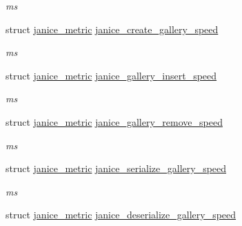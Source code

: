 \begin{DoxyCompactItemize}
\begin{DoxyCompactList}\small\item\em ms \end{DoxyCompactList}\item 
\hypertarget{structjanice__metrics_a156ed6a7e2ace1daef014af5202eda8f}{}struct \hyperlink{structjanice__metric}{janice\+\_\+metric} \hyperlink{structjanice__metrics_a156ed6a7e2ace1daef014af5202eda8f}{janice\+\_\+create\+\_\+gallery\+\_\+speed}\label{structjanice__metrics_a156ed6a7e2ace1daef014af5202eda8f}

\begin{DoxyCompactList}\small\item\em ms \end{DoxyCompactList}\item 
\hypertarget{structjanice__metrics_adde99d91b8bc0626e9f4ed24f3542e3f}{}struct \hyperlink{structjanice__metric}{janice\+\_\+metric} \hyperlink{structjanice__metrics_adde99d91b8bc0626e9f4ed24f3542e3f}{janice\+\_\+gallery\+\_\+insert\+\_\+speed}\label{structjanice__metrics_adde99d91b8bc0626e9f4ed24f3542e3f}

\begin{DoxyCompactList}\small\item\em ms \end{DoxyCompactList}\item 
\hypertarget{structjanice__metrics_a2a69b582c1729b2992cfe65bce6fa790}{}struct \hyperlink{structjanice__metric}{janice\+\_\+metric} \hyperlink{structjanice__metrics_a2a69b582c1729b2992cfe65bce6fa790}{janice\+\_\+gallery\+\_\+remove\+\_\+speed}\label{structjanice__metrics_a2a69b582c1729b2992cfe65bce6fa790}

\begin{DoxyCompactList}\small\item\em ms \end{DoxyCompactList}\item 
\hypertarget{structjanice__metrics_aa23bb604381d13d8c673290a5064fed1}{}struct \hyperlink{structjanice__metric}{janice\+\_\+metric} \hyperlink{structjanice__metrics_aa23bb604381d13d8c673290a5064fed1}{janice\+\_\+serialize\+\_\+gallery\+\_\+speed}\label{structjanice__metrics_aa23bb604381d13d8c673290a5064fed1}

\begin{DoxyCompactList}\small\item\em ms \end{DoxyCompactList}\item 
\hypertarget{structjanice__metrics_a2a8b9ce524a63629ad345f73c6c084a5}{}struct \hyperlink{structjanice__metric}{janice\+\_\+metric} \hyperlink{structjanice__metrics_a2a8b9ce524a63629ad345f73c6c084a5}{janice\+\_\+deserialize\+\_\+gallery\+\_\+speed}\label{structjanice__metrics_a2a8b9ce524a63629ad345f73c6c084a5}


\end{DoxyCompactItemize}
